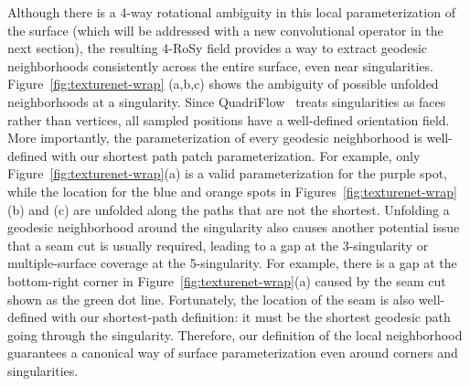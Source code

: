 Although there is a 4-way rotational ambiguity in this local parameterization of the surface (which will be addressed with a new convolutional operator in the next section), the resulting 4-RoSy field provides a way to extract geodesic neighborhoods consistently across the entire surface, even near singularities. 
Figure~\ref{fig:texturenet-wrap} (a,b,c) shows the ambiguity of possible unfolded neighborhoods at a singularity.  Since QuadriFlow~\cite{huang2018quadriflow} treats singularities as faces rather than vertices, all sampled positions have a well-defined orientation field. More importantly, the parameterization of every geodesic neighborhood is well-defined with our shortest path patch parameterization. For example, only Figure~\ref{fig:texturenet-wrap}(a) is a valid parameterization for the purple spot, while the location for the blue and orange spots in Figures~\ref{fig:texturenet-wrap}(b) and (c) are unfolded along the paths that are not the shortest. Unfolding a geodesic neighborhood around the singularity also causes another potential issue that a seam cut is usually required, leading to a gap at the 3-singularity or multiple-surface coverage at the 5-singularity. For example, there is a gap at the bottom-right corner in Figure~\ref{fig:texturenet-wrap}(a) caused by the seam cut shown as the green dot line. Fortunately, the location of the seam is also well-defined with our shortest-path definition: it must be the shortest geodesic path going through the singularity. Therefore, our definition of the local neighborhood guarantees a canonical way of surface parameterization even around corners and singularities.

